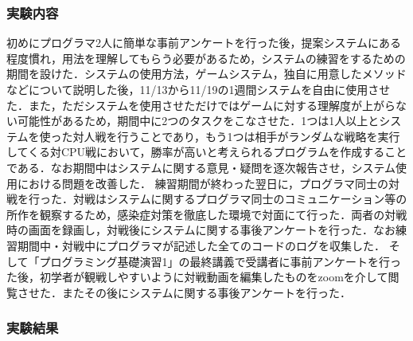 \subsubsection{実験内容}

初めにプログラマ2人に簡単な事前アンケートを行った後，提案システムにある程度慣れ，用法を理解してもらう必要があるため，システムの練習をするための期間を設けた．システムの使用方法，ゲームシステム，独自に用意したメソッドなどについて説明した後，11/13から11/19の1週間システムを自由に使用させた．また，ただシステムを使用させただけではゲームに対する理解度が上がらない可能性があるため，期間中に2つのタスクをこなさせた．1つは1人以上とシステムを使った対人戦を行うことであり，もう1つは相手がランダムな戦略を実行してくる対CPU戦において，勝率が高いと考えられるプログラムを作成することである．なお期間中はシステムに関する意見・疑問を逐次報告させ，システム使用における問題を改善した．
練習期間が終わった翌日に，プログラマ同士の対戦を行った．対戦はシステムに関するプログラマ同士のコミュニケーション等の所作を観察するため，感染症対策を徹底した環境で対面にて行った．両者の対戦時の画面を録画し，対戦後にシステムに関する事後アンケートを行った．なお練習期間中・対戦中にプログラマが記述した全てのコードのログを収集した．
そして「プログラミング基礎演習1」の最終講義で受講者に事前アンケートを行った後，初学者が観戦しやすいように対戦動画を編集したものをzoomを介して閲覧させた．またその後にシステムに関する事後アンケートを行った．

\subsubsection{実験結果}

